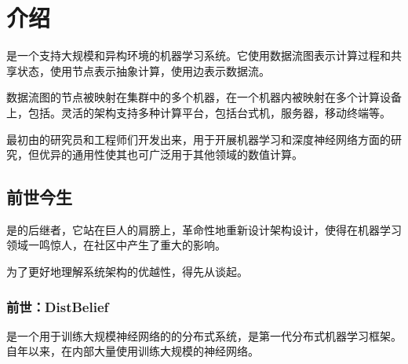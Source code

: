 \begin{savequote}[45mm]
\end{savequote}

\chapter{介绍} 
\label{ch:introduction}

\begin{content}

是一个支持大规模和异构环境的机器学习系统。它使用数据流图表示计算过程和共享状态，使用节点表示抽象计算，使用边表示数据流。

数据流图的节点被映射在集群中的多个机器，在一个机器内被映射在多个计算设备上，包括。灵活的架构支持多种计算平台，包括台式机，服务器，移动终端等。

\tf{}最初由的研究员和工程师们开发出来，用于开展机器学习和深度神经网络方面的研究，但\tf{}优异的通用性使其也可广泛用于其他领域的数值计算。

\end{content}

\section{前世今生}

\begin{content}

\tf{}是的后继者，它站在巨人的肩膀上，革命性地重新设计架构设计，使得\tf{}在机器学习领域一鸣惊人，在社区中产生了重大的影响。

为了更好地理解\tf{}系统架构的优越性，得先从谈起。

\end{content}

\subsection{前世：DistBelief}

\begin{content}

是一个用于训练大规模神经网络的的分布式系统，是第一代分布式机器学习框架。自年以来，在内部大量使用训练大规模的神经网络。

\end{content}

